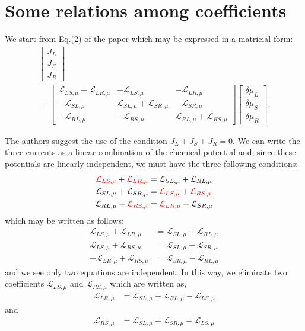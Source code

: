 \section{Some relations among coefficients}
We start from Eq.(2) of the paper which may be expressed in a matricial form:
\begin{multline*}
\begin{bmatrix}
J_{L}
\\
J_{S}
\\
J_{R}
\end{bmatrix}
\\=
\begin{bmatrix}
\mathcal{L}_{LS,\mu}+\mathcal{L}_{LR,\mu} & -\mathcal{L}_{LS,\mu} & -\mathcal{L}_{LR,\mu}
\\
-\mathcal{L}_{SL,\mu} & \mathcal{L}_{SL,\mu}+\mathcal{L}_{SR,\mu} & -\mathcal{L}_{SR,\mu}
\\
-\mathcal{L}_{RL,\mu} & -\mathcal{L}_{RS,\mu} & \mathcal{L}_{RL,\mu}+\mathcal{L}_{RS,\mu}
\end{bmatrix}
\begin{bmatrix}
\delta\mu_{L}
\\
\delta\mu_{S}
\\
\delta\mu_{R}
\end{bmatrix}.
\end{multline*}

The authors suggest the use of the condition $J_{L}+J_{S}+J_{R}=0$. We can write the three currents as a linear combination of the chemical potential and, since these potentials are linearly independent, we must have the three following conditions:
\begin{align*}
\textcolor{red}{\mathcal{L}_{LS,\mu}}+\textcolor{red}{\mathcal{L}_{LR,\mu}}
&=
\mathcal{L}_{SL,\mu}+\mathcal{L}_{RL,\mu}
\\
\mathcal{L}_{SL,\mu}+\mathcal{L}_{SR,\mu}
&=
\textcolor{red}{\mathcal{L}_{LS,\mu}}+\textcolor{red}{\mathcal{L}_{RS,\mu}}
\\
\mathcal{L}_{RL,\mu}+\textcolor{red}{\mathcal{L}_{RS,\mu}}
&=
\textcolor{red}{\mathcal{L}_{LR,\mu}}+\mathcal{L}_{SR,\mu}
\end{align*}
which may be written as follows:
\begin{align*}
\mathcal{L}_{LS,\mu}+\mathcal{L}_{LR,\mu}
&=
\mathcal{L}_{SL,\mu}+\mathcal{L}_{RL,\mu}
\\
\mathcal{L}_{LS,\mu}+\mathcal{L}_{RS,\mu}
&=
\mathcal{L}_{SL,\mu}+\mathcal{L}_{SR,\mu}
\\
-\mathcal{L}_{LR,\mu}+\mathcal{L}_{RS,\mu}
&=
\mathcal{L}_{SR,\mu}-\mathcal{L}_{RL,\mu}
\end{align*}
and we see only two equations are independent. In this way, we eliminate two coefficients $\mathcal{L}_{LS,\mu}$ and $\mathcal{L}_{RS,\mu}$ which are written as, 
\begin{align*}
\mathcal{L}_{LR,\mu}
&=
\mathcal{L}_{SL,\mu}+\mathcal{L}_{RL,\mu}-\mathcal{L}_{LS,\mu}
\end{align*}
and
\begin{align*}
\mathcal{L}_{RS,\mu}
&=
\mathcal{L}_{SL,\mu}+\mathcal{L}_{SR,\mu}-\mathcal{L}_{LS,\mu}
\end{align*}

